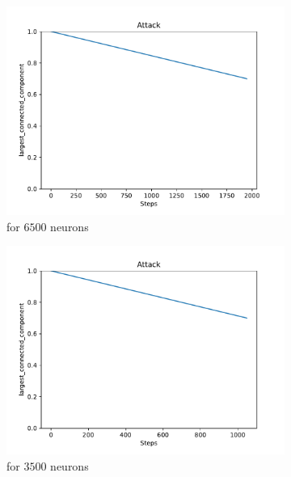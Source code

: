 \begin{figure}
\begin{subfigure}[b]{0.45\textwidth}
		\centering
		\includegraphics[width=\textwidth]{Images/plots_ib/ib_28.pdf}
		\caption{for $6500$ neurons}
	\end{subfigure}
	\hfill
	\begin{subfigure}[b]{0.45\textwidth}
		\centering
		\includegraphics[width=\textwidth]{Images/plots_ib/ib_34.pdf}
		\caption{for $3500$ neurons}
	\end{subfigure}
	\\ \vspace{5mm}
	\begin{subfigure}[b]{0.45\textwidth}
		\centering

\end{subfigure}
\end{figure}
